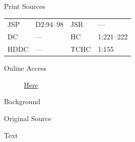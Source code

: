 {			\begin{description}
				\item[Print Sources]
			\end{description}

				\begin{tabular}{p{0.5in}p{1in}p{0.5in}p{1in}}
				JSP	 	& D2:94--98		& JSR 		& --- \\
				DC	 	& ---		 	& HC 		& 1:221--222 \\
				HDDC 	& ---			& TCHC 		& 1:155 \\
				\end{tabular}
			
			\begin{description}
				\item[Online Access] \href{https://www.josephsmithpapers.org/paper-summary/minutes-1-2-november-1831/1}{Here}
			\end{description}
			
			\begin{description}
				\item[Background]
			\end{description}
			
			
			\begin{description}
				\item[Original Source]
			\end{description}
			
			
			\begin{description}
				\item[Text]
			\end{description}
			
}
